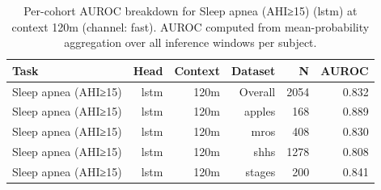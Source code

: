 \begin{table}[ht]
\centering
\caption{Per-cohort AUROC breakdown for Sleep apnea (AHI≥15) (lstm) at context 120m (channel: fast). AUROC computed from mean-probability aggregation over all inference windows per subject.}
\label{tab:cohort_apnea_binary_lstm_fast}
\begin{tabular}{lrrrrr}
\toprule
Task & Head & Context & Dataset & N & AUROC \\
\midrule
Sleep apnea (AHI≥15) & lstm & 120m & Overall & 2054 & 0.832 \\
Sleep apnea (AHI≥15) & lstm & 120m & apples & 168 & 0.889 \\
Sleep apnea (AHI≥15) & lstm & 120m & mros & 408 & 0.830 \\
Sleep apnea (AHI≥15) & lstm & 120m & shhs & 1278 & 0.808 \\
Sleep apnea (AHI≥15) & lstm & 120m & stages & 200 & 0.841 \\
\bottomrule
\end{tabular}
\end{table}